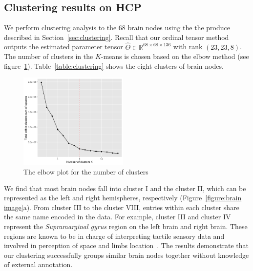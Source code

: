 \documentclass[11pt]{article}
\theoremstyle{plain}
\theoremstyle{definition}
\begin{document}
\subsection{Clustering results on HCP}
We perform clustering analysis to the 68 brain nodes using the the produce described in Section~\ref{sec:clustering}. Recall that our ordinal tensor method outputs the estimated parameter tensor $\hat\Theta\in\mathbb{R}^{68\times 68\times136}$ with rank $(23,23,8)$. 
The number of clusters in the $K$-means is chosen based on the elbow method (see figure~\ref{figure:elbow}). Table~\ref{table:clustering} shows the eight clusters of brain nodes. 
\begin{figure}[H]
  \label{figure:elbow}
  \begin{center}
    \includegraphics[width=0.48\textwidth]{elbowmethod.png}
  \end{center}
  \caption{The elbow plot for the number of clusters}
\end{figure}


We find that most brain nodes fall into cluster I and the cluster II, which can be represented as the left and right hemispheres, respectively (Figure~\ref{figure:brain image}a). From cluster III to the cluster VIII, entries within each cluster share the same name encoded in the data. For example, cluster III and cluster IV represent the {\it Supramarginal gyrus} region on the left brain and right brain. These regions are known to be in charge of interpreting tactile sensory data and involved in perception of space and limbs location~\cite{carlson2012physiology,reed1994nature}.  
The results demonstrate that our clustering successfully groups similar brain nodes together without knowledge of external annotation.
\end{document}
